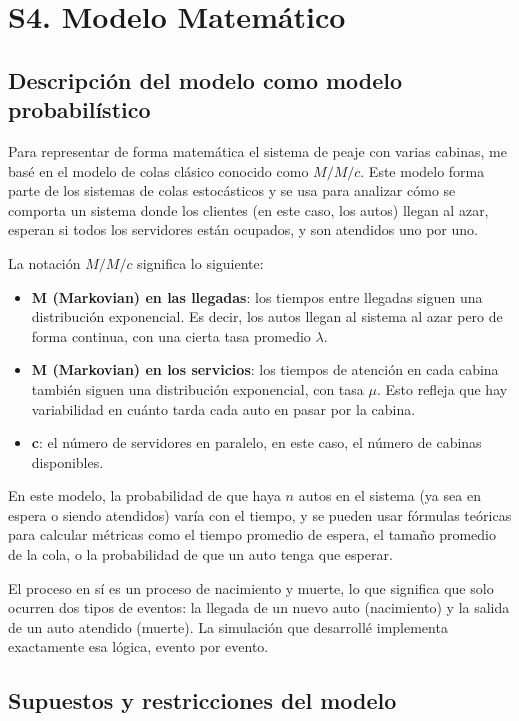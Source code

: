 \documentclass[12pt]{article}
\begin{document}
\section*{S4. Modelo Matemático}

\subsection*{Descripción del modelo como modelo probabilístico}

Para representar de forma matemática el sistema de peaje con varias cabinas, me basé en el modelo de colas clásico conocido como $M/M/c$. Este modelo forma parte de los sistemas de colas estocásticos y se usa para analizar cómo se comporta un sistema donde los clientes (en este caso, los autos) llegan al azar, esperan si todos los servidores están ocupados, y son atendidos uno por uno.

La notación $M/M/c$ significa lo siguiente:

\begin{itemize}
  \item \textbf{M (Markovian) en las llegadas}: los tiempos entre llegadas siguen una distribución exponencial. Es decir, los autos llegan al sistema al azar pero de forma continua, con una cierta tasa promedio $\lambda$.
  \item \textbf{M (Markovian) en los servicios}: los tiempos de atención en cada cabina también siguen una distribución exponencial, con tasa $\mu$. Esto refleja que hay variabilidad en cuánto tarda cada auto en pasar por la cabina.
  \item \textbf{c}: el número de servidores en paralelo, en este caso, el número de cabinas disponibles.
\end{itemize}

En este modelo, la probabilidad de que haya $n$ autos en el sistema (ya sea en espera o siendo atendidos) varía con el tiempo, y se pueden usar fórmulas teóricas para calcular métricas como el tiempo promedio de espera, el tamaño promedio de la cola, o la probabilidad de que un auto tenga que esperar.

El proceso en sí es un proceso de nacimiento y muerte, lo que significa que solo ocurren dos tipos de eventos: la llegada de un nuevo auto (nacimiento) y la salida de un auto atendido (muerte). La simulación que desarrollé implementa exactamente esa lógica, evento por evento.

\subsection*{Supuestos y restricciones del modelo}
\end{document}
